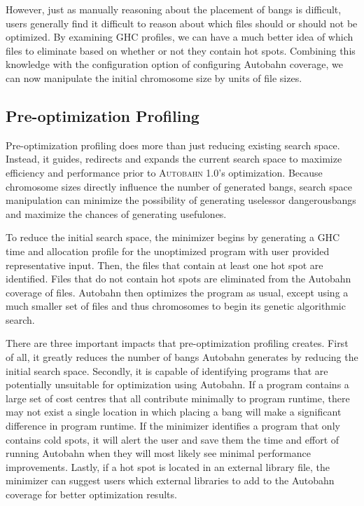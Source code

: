 \documentclass[format=sigplan]{acmart}
\newcommand{\hotspot}[0]{hot spot}
\newcommand{\hotspots}[0]{hot spots}
\newcommand{\coldspots}[0]{cold spots}
\newcommand{\dangerous}[0]{dangerous}
\newcommand{\useful}[0]{useful}
\newcommand{\useless}[0]{useless}
\newcommand{\Ao}[0]{\textsc{Autobahn 1.0}}
\newcommand{\preopt}[0]{pre-optimization}
\newcommand{\Preopt}[0]{Pre-optimization}
\begin{document}
However, just as manually reasoning about the placement of bangs is difficult, users generally find it difficult to reason about which files should or should not be optimized. By examining GHC profiles, we can have a much better idea of which files to eliminate based on whether or not they contain \hotspots{}. Combining this knowledge with the configuration option of configuring Autobahn coverage, we can now manipulate the initial chromosome size by units of file sizes. 

\subsection{\Preopt{} Profiling}

\Preopt{} profiling does more than just reducing existing search space. Instead, it guides, redirects and expands the current search space to maximize efficiency and performance prior to \Ao{}'s optimization. Because chromosome sizes directly influence the number of generated bangs, search space manipulation can minimize the possibility of generating \useless or \dangerous bangs and maximize the chances of generating \useful ones.

To reduce the initial search space, the minimizer begins by generating a GHC time and allocation profile for the unoptimized program with user provided representative input. Then, the files that contain at least one \hotspot{} are identified. Files that do not contain \hotspots{} are eliminated from the Autobahn coverage of files. Autobahn then optimizes the program as usual, except using a much smaller set of files and thus chromosomes to begin its genetic algorithmic search. 

There are three important impacts that \preopt{} profiling creates. First of all, it greatly reduces the number of bangs Autobahn generates by reducing the initial search space. Secondly, it is capable of identifying programs that are potentially unsuitable for optimization using Autobahn. If a program contains a large set of cost centres that all contribute minimally to program runtime, there may not exist a single location in which placing a bang will make a significant difference in program runtime. If the minimizer identifies a program that only contains \coldspots{}, it will alert the user and save them the time and effort of running Autobahn when they will most likely see minimal performance improvements. Lastly, if a \hotspot{} is located in an external library file, the minimizer can suggest users which external libraries to add to the Autobahn coverage for better optimization results.
\end{document}
